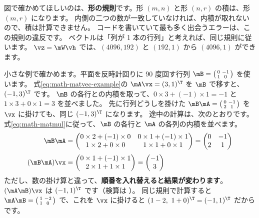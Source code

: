 図で確かめてほしいのは、\textbf{形の規則}です。形 $(m,n)$ と形 $(n,r)$ の積は、形 $(m,r)$ になります。
内側の二つの数が一致していなければ、内積が取れないので、積は計算できません。
コードを書いていて最も多く出会うエラーは、この規則の違反です。
ベクトルは「列が 1 本の行列」と考えれば、同じ規則に従います。
$\vz=\mW\vh$ では、$(4096,192)$ と $(192,1)$ から $(4096,1)$ ができます。

小さな例で確かめます。平面を反時計回りに 90 度回す行列 $\mB=\bigl(\begin{smallmatrix}0&-1\\1&0\end{smallmatrix}\bigr)$ を使います。
式\eqref{eq:math-matvec-example}の $\mA\vx=(3,1)^\T$ を $\mB$ で移すと、$(-1,3)^\T$ です。
$\mB$ の各行との内積を取って、$0\times 3+(-1)\times 1=-1$ と $1\times 3+0\times 1=3$ を並べました。
先に行列どうしを掛けた $\mB\mA=\bigl(\begin{smallmatrix}0&-1\\2&1\end{smallmatrix}\bigr)$ を $\vx$ に掛けても、同じ $(-1,3)^\T$ になります。
途中の計算は、次のとおりです。式\eqref{eq:math-matmul}に従って、$\mB$ の各行と $\mA$ の各列の内積を並べます。
\begin{align*}
\mB\mA&=\begin{pmatrix}0\times 2+(-1)\times 0&0\times 1+(-1)\times 1\\1\times 2+0\times 0&1\times 1+0\times 1\end{pmatrix}
=\begin{pmatrix}0&-1\\2&1\end{pmatrix}\\[1mm]
(\mB\mA)\vx&=\begin{pmatrix}0\times 1+(-1)\times 1\\2\times 1+1\times 1\end{pmatrix}=\begin{pmatrix}-1\\3\end{pmatrix}
\end{align*}
ただし、数の掛け算と違って、\textbf{順番を入れ替えると結果が変わります}。$(\mA\mB)\vx$ は $(-1,1)^\T$ です（検算は ）。
同じ規則で計算すると $\mA\mB=\bigl(\begin{smallmatrix}1&-2\\1&0\end{smallmatrix}\bigr)$ で、これを $\vx$ に掛けると $(1-2,\ 1+0)^\T=(-1,1)^\T$ だからです。

